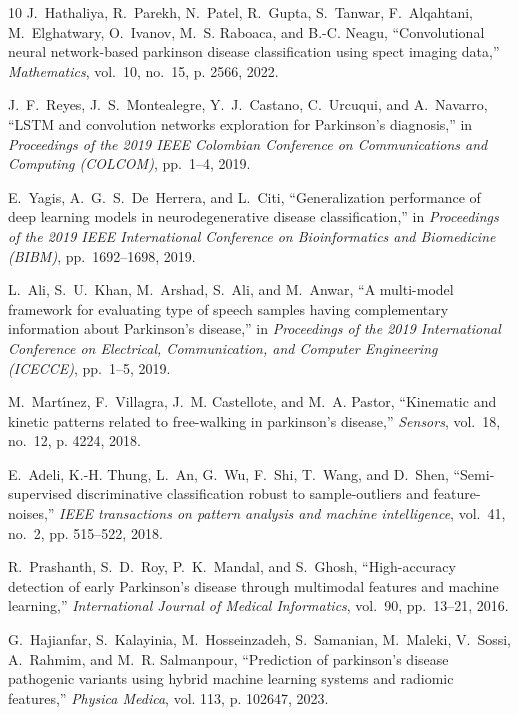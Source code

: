 \documentclass{article}
\begin{document}
\begin{thebibliography}{10}
J.~Hathaliya, R.~Parekh, N.~Patel, R.~Gupta, S.~Tanwar, F.~Alqahtani,
  M.~Elghatwary, O.~Ivanov, M.~S. Raboaca, and B.-C. Neagu, ``Convolutional
  neural network-based parkinson disease classification using spect imaging
  data,'' \emph{Mathematics}, vol.~10, no.~15, p. 2566, 2022.

J.~F.~Reyes, J.~S.~Montealegre, Y.~J.~Castano, C.~Urcuqui, and A.~Navarro,
``LSTM and convolution networks exploration for Parkinson’s diagnosis,''
in \emph{Proceedings of the 2019 IEEE Colombian Conference on Communications and Computing (COLCOM)}, 
pp.~1--4, 2019.

E.~Yagis, A.~G.~S.~De~Herrera, and L.~Citi,
``Generalization performance of deep learning models in neurodegenerative disease classification,''
in \emph{Proceedings of the 2019 IEEE International Conference on Bioinformatics and Biomedicine (BIBM)}, 
pp.~1692--1698, 2019.

L.~Ali, S.~U.~Khan, M.~Arshad, S.~Ali, and M.~Anwar,
``A multi-model framework for evaluating type of speech samples having complementary information about Parkinson's disease,''
in \emph{Proceedings of the 2019 International Conference on Electrical, Communication, and Computer Engineering (ICECCE)}, 
pp.~1--5, 2019.

M.~Mart{\'\i}nez, F.~Villagra, J.~M. Castellote, and M.~A. Pastor, ``Kinematic
  and kinetic patterns related to free-walking in parkinson’s disease,''
  \emph{Sensors}, vol.~18, no.~12, p. 4224, 2018.

E.~Adeli, K.-H. Thung, L.~An, G.~Wu, F.~Shi, T.~Wang, and D.~Shen,
  ``Semi-supervised discriminative classification robust to sample-outliers and
  feature-noises,'' \emph{IEEE transactions on pattern analysis and machine
  intelligence}, vol.~41, no.~2, pp. 515--522, 2018.

R.~Prashanth, S.~D.~Roy, P.~K.~Mandal, and S.~Ghosh,
``High-accuracy detection of early Parkinson's disease through multimodal features and machine learning,''
\emph{International Journal of Medical Informatics}, vol.~90, pp.~13--21, 2016.

G.~Hajianfar, S.~Kalayinia, M.~Hosseinzadeh, S.~Samanian, M.~Maleki, V.~Sossi,
  A.~Rahmim, and M.~R. Salmanpour, ``Prediction of parkinson’s disease
  pathogenic variants using hybrid machine learning systems and radiomic
  features,'' \emph{Physica Medica}, vol. 113, p. 102647, 2023.


\end{thebibliography}
\end{document}
